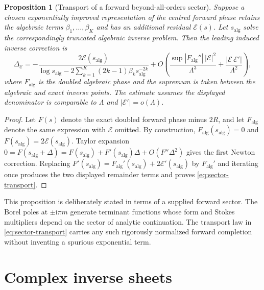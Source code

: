 \documentclass[11pt,a4paper,oneside]{article}
\theoremstyle{plain}
\newtheorem{proposition}[theorem]{Proposition}
\theoremstyle{definition}
\theoremstyle{remark}
\newcommand{\ii}{\mathrm i}
\begin{document}
\begin{proposition}[Transport of a forward beyond-all-orders sector]
\label{prop:sector-transport}
Suppose a chosen exponentially improved representation of the centred forward
phase retains the algebraic terms $\beta_1,\ldots,\beta_K$ and has an
additional residual $\mathcal E(s)$.  Let $s_{\mathrm{alg}}$ solve the
correspondingly truncated algebraic inverse problem.  Then the leading induced
inverse correction is
\begin{equation}
 \Delta_{\mathcal E}
 =-\frac{2\mathcal E(s_{\mathrm{alg}})}
 {\log s_{\mathrm{alg}}-2\sum_{k=1}^{K}(2k-1)\beta_k
  s_{\mathrm{alg}}^{-2k}}
 +O\!\left(
 \frac{\sup|F_{\mathrm{alg}}''|\,|\mathcal E|^2}{\Lambda^3}
 +\frac{|\mathcal E\,\mathcal E'|}{\Lambda^2}
 \right),
 \label{eq:sector-transport}
\end{equation}
where $F_{\mathrm{alg}}$ is the doubled algebraic phase and the supremum is
taken between the algebraic and exact inverse points.  The estimate assumes
the displayed denominator is comparable to $\Lambda$ and
$|\mathcal E'|=o(\Lambda)$.
\end{proposition}

\begin{proof}
Let $F(s)$ denote the exact doubled forward phase minus $2R$, and let
$F_{\mathrm{alg}}$ denote the same expression with $\mathcal E$ omitted.
By construction, $F_{\mathrm{alg}}(s_{\mathrm{alg}})=0$ and
$F(s_{\mathrm{alg}})=2\mathcal E(s_{\mathrm{alg}})$.  Taylor expansion
$0=F(s_{\mathrm{alg}}+\Delta)=F(s_{\mathrm{alg}})+F'(s_{\mathrm{alg}})\Delta
+O(F''\Delta^2)$ gives the first Newton correction.  Replacing
$F'(s_{\mathrm{alg}})=F_{\mathrm{alg}}'(s_{\mathrm{alg}})
+2\mathcal E'(s_{\mathrm{alg}})$ by $F_{\mathrm{alg}}'$ and iterating once
produces the two displayed remainder terms and proves
\cref{eq:sector-transport}.
\end{proof}

This proposition is deliberately stated in terms of a supplied forward sector.
The Borel poles at $\pm\ii\pi m$ generate terminant functions whose form and
Stokes multipliers depend on the sector of analytic continuation.  The transport law
in \cref{eq:sector-transport} carries any such rigorously normalized forward
completion without inventing a spurious exponential term.

\section{Complex inverse sheets}
\label{sec:complex}
\end{document}
